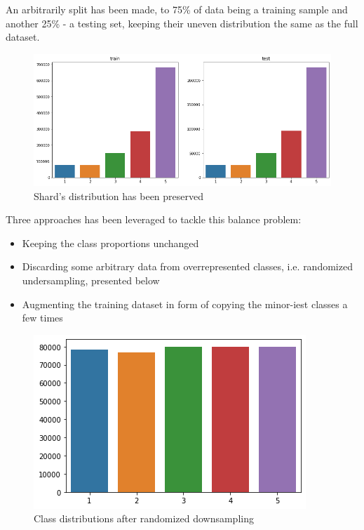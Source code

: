 \documentclass[letterpaper]{article}
\begin{document}
An arbitrarily split has been made, to 75\% of data being a training sample and another 25\% - a testing set,
keeping their uneven distribution the same as the full dataset.

\begin{figure}[t]
    \centering
    \includegraphics[scale=0.3]{train-test.png}
    \caption{Shard's distribution has been preserved}
\end{figure}

Three approaches has been leveraged to tackle this balance problem:

\begin{itemize}
    \item Keeping the class proportions unchanged
    \item Discarding some arbitrary data from overrepresented classes, i.e. randomized undersampling, presented below
    \item Augmenting the training dataset in form of copying the minor-iest classes a few times
\end{itemize}

\begin{figure}[h]
    \centering
    \includegraphics[scale=0.5]{downsampling.png}
    \caption{Class distributions after randomized downsampling}
\end{figure}
\end{document}
